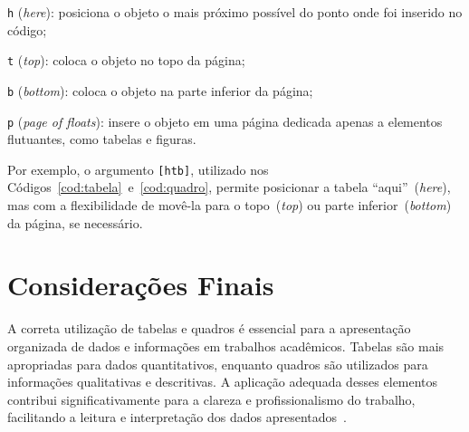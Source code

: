 \begin{alineas}
    \item \texttt{h} (\textit{here}): posiciona o objeto o mais próximo possível do ponto onde foi inserido no código;
    \item \texttt{t} (\textit{top}): coloca o objeto no topo da página;
    \item \texttt{b} (\textit{bottom}): coloca o objeto na parte inferior da página;
    \item \texttt{p} (\textit{page of floats}): insere o objeto em uma página dedicada apenas a elementos flutuantes, como tabelas e figuras.
\end{alineas}

Por exemplo, o argumento \texttt{[htb]}, utilizado nos Códigos~\ref{cod:tabela}~e~\ref{cod:quadro}, permite posicionar a tabela ``aqui''~(\textit{here}), mas com a flexibilidade de movê-la para o topo~(\textit{top}) ou parte inferior~(\textit{bottom}) da página, se necessário.

\section{Considerações Finais}

A correta utilização de tabelas e quadros é essencial para a apresentação organizada de dados e informações em trabalhos acadêmicos. Tabelas são mais apropriadas para dados quantitativos, enquanto quadros são utilizados para informações qualitativas e descritivas. A aplicação adequada desses elementos contribui significativamente para a clareza e profissionalismo do trabalho, facilitando a leitura e interpretação dos dados apresentados~\cite{knuth1984texbook}.
